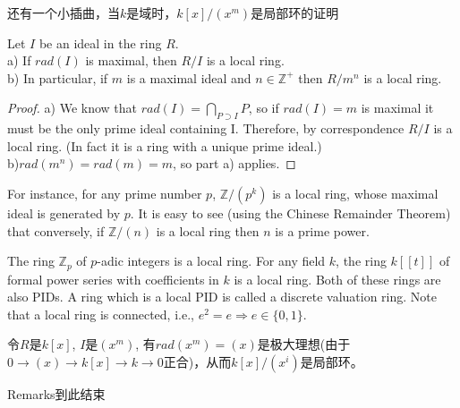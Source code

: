 还有一个小插曲，当$k$是域时，$k[x]/(x^m)$是局部环的证明
\begin{prop}
	 Let $I$ be an ideal in the ring $R$.\\
a) If $rad(I)$ is maximal, then $R/I$ is a local ring.\\
b) In particular, if $m$ is a maximal ideal and $n \in \mathbb{Z}^+$ then $R/m^n$ is a local ring.
\end{prop}
\begin{proof}
a) We know that $rad(I)=\bigcap_{P\supset I}P$, so if $rad(I) = m$ is maximal it must be the only prime ideal containing I. Therefore, by correspondence $R/I$ is a local ring. (In fact it is a ring with a unique prime ideal.)\\
b)$rad(m^n) = rad(m) = m$, so part a) applies. 
\end{proof}

\begin{example}
	For instance, for any prime number $p$, $\mathbb{Z}/(p^k)$ is a local ring, whose maximal ideal is generated by $p$. It is easy to see (using the Chinese Remainder Theorem) that conversely, if $\mathbb{Z}/(n)$ is a local ring then $n$ is a prime power. 

	The ring $\mathbb{Z}_p$ of $p$-adic integers is a local ring. For any field $k$, the ring $k[[t]]$ of formal power series with coefficients in $k$ is a local ring. Both of these rings are also PIDs. A ring which is a local PID is called a discrete valuation ring. Note that a local ring is connected, i.e., $e^2 = e \Rightarrow e \in \{0,1\}$.

令$R$是$k[x]$, $I$是$(x^m)$, 有$rad(x^m)=(x)$是极大理想(由于$0\rightarrow (x) \rightarrow k[x]\rightarrow k \rightarrow 0$正合)，从而$k[x]/(x^i)$是局部环。
\end{example}
Remarks到此结束
